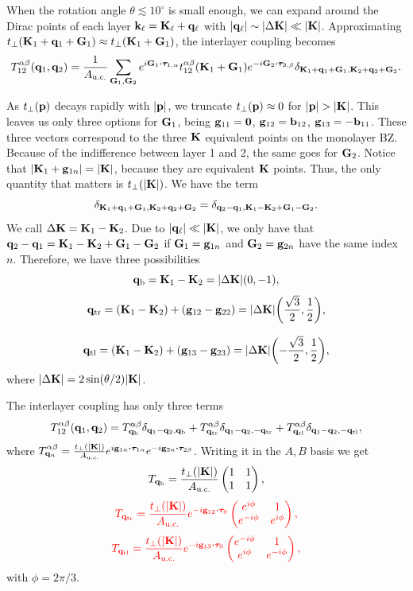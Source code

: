 \documentclass[a4paper,12pt]{report}
\begin{document}
When the rotation angle $\theta \lesssim 10^\circ$ is small enough, we can expand around the Dirac points of each layer ${\vb{k}}_\ell = {\vb{K}}_\ell + {\vb{q}}_\ell$ with $\abs{{\vb{q}}_\ell} \sim \abs{\Delta {\vb{K}}} \ll \abs{{\vb{K}}}$. Approximating $t_\perp({\vb{K}}_1+{\vb{q}}_1+{\vb{G}}_1) \approx t_\perp({\vb{K}}_1+{\vb{G}}_1)$, the interlayer coupling becomes
$$
T_{12}^{\alpha\beta}(\q_1,\q_2) = \frac{1}{A_{\text{u.c.}}} \sum_{\G_1,\G_2} e^{i\G_1\vdot\vtau_{1,\alpha}}
t_{12}^{\alpha\beta}(\K_1+\G_1) e^{-i\G_2\vdot\vtau_{2,\beta}}
\delta_{\K_1+\q_1+\G_1,\K_2+\q_2+\G_2}.
$$

As $t_\perp({\vb{p}})$ decays rapidly with $\abs{{\vb{p}}}$, we truncate $t_\perp({\vb{p}}) \approx 0$ for $\abs{{\vb{p}}} > \abs{{\vb{K}}}$. This leaves us only three options for ${\vb{G}}_1$, being ${\vb{g}}_{11} = {\vb{0}}$, ${\vb{g}}_{12} = {\vb{b}}_{12}$, ${\vb{g}}_{13} = -{\vb{b}}_{11}$. These three vectors correspond to the three ${\vb{K}}$ equivalent points on the monolayer BZ. Because of the indifference between layer 1 and 2, the same goes for ${\vb{G}}_2$. Notice that $\abs{{\vb{K}}_1+{\vb{g}}_{1n}} = \abs{{\vb{K}}}$, because they are equivalent ${\vb{K}}$ points. Thus, the only quantity that matters is $t_\perp(\abs{{\vb{K}}})$. We have the term
$$
\delta_{{\vb{K}}_1+{\vb{q}}_1+{\vb{G}}_1,{\vb{K}}_2+{\vb{q}}_2+{\vb{G}}_2} = \delta_{{\vb{q}}_2-{\vb{q}}_1,{\vb{K}}_1-{\vb{K}}_2+{\vb{G}}_1-{\vb{G}}_2}.
$$
We call $\Delta{\vb{K}} = {\vb{K}}_1-{\vb{K}}_2$. Due to $\abs{{\vb{q}}_\ell} \ll \abs{{\vb{K}}}$, we only have that ${\vb{q}}_2-{\vb{q}}_1 = {\vb{K}}_1-{\vb{K}}_2+{\vb{G}}_1-{\vb{G}}_2$ if ${\vb{G}}_1 = {\vb{g}}_{1n}$ and ${\vb{G}}_2 = {\vb{g}}_{2n}$ have the same index $n$. Therefore, we have three possibilities
$$
{\vb{q}}_\text{b} = {\vb{K}}_1 - {\vb{K}}_2 = \abs{\Delta {\vb{K}}} \qty(0, -1),
$$
$$
{\vb{q}}_\text{tr} = ({\vb{K}}_1 - {\vb{K}}_2) + ({\vb{g}}_{12} - {\vb{g}}_{22}) = \abs{\Delta {\vb{K}}} \qty(\frac{\sqrt{3}}{2}, \frac{1}{2}),
$$

$$
{\vb{q}}_\text{tl} = ({\vb{K}}_1 - {\vb{K}}_2) + ({\vb{g}}_{13} - {\vb{g}}_{23}) = \abs{\Delta {\vb{K}}} \qty(-\frac{\sqrt{3}}{2}, \frac{1}{2}),
$$
where $\abs{\Delta {\vb{K}}} = 2 \sin(\theta/2) \abs{{\vb{K}}}$.

The interlayer coupling has only three terms
$$
T_{12}^{\alpha\beta}({\vb{q}}_1,{\vb{q}}_2) =
T^{\alpha\beta}_{{\vb{q}}_\text{b}} \delta_{{\vb{q}}_1-{\vb{q}}_2, {\vb{q}}_\text{b}} +
T^{\alpha\beta}_{{\vb{q}}_\text{tr}} \delta_{{\vb{q}}_1-{\vb{q}}_2, -{\vb{q}}_\text{tr}} +
T^{\alpha\beta}_{{\vb{q}}_\text{tl}} \delta_{{\vb{q}}_1-{\vb{q}}_2, -{\vb{q}}_\text{tl}},
$$
where $T^{\alpha\beta}_{\q_n} = \frac{t_\perp(\abs{\K})}{A_{\text{u.c.}}} e^{i \g_{1n} \vdot \bm{\tau}_{1\alpha}}
e^{-i \g_{2n} \vdot \bm{\tau}_{2\beta}}$. Writing it in the $A, B$ basis we get
$$
T_{{\vb{q}}_\text{b}} = \frac{t_\perp(\abs{{\vb{K}}})}{A_{\text{u.c.}}}
\begin{pmatrix}
1 & 1 \\
1 & 1
\end{pmatrix},
$$
$$
\textcolor{red}{
T_{\q_\text{tr}} = \frac{t_\perp(\abs{\K})}{A_{\text{u.c.}}} e^{-i \g_{12} \vdot \vtau_0}
\begin{pmatrix}
e^{i\phi} & 1 \\
e^{-i\phi} & e^{i\phi}
\end{pmatrix},
}
$$
$$
\textcolor{red}{
T_{\q_\text{tl}} = \frac{t_\perp(\abs{\K})}{A_{\text{u.c.}}} e^{-i \g_{13} \vdot \vtau_0}
\begin{pmatrix}
e^{-i\phi} & 1 \\
e^{i\phi} & e^{-i\phi}
\end{pmatrix},
}
$$
with $\phi = 2\pi/3$.
\end{document}
